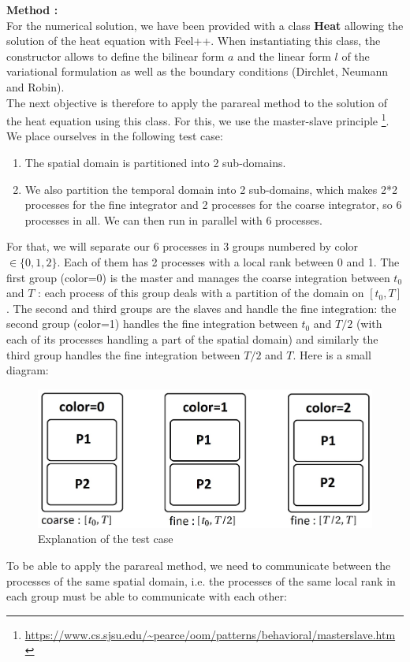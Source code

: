 \noindent \textbf{Method :} \\
For the numerical solution, we have been provided with a class \textbf{Heat} allowing the solution of the heat equation with Feel++. When instantiating this class, the constructor allows to define the bilinear form $a$ and the linear form $l$ of the variational formulation as well as the boundary conditions (Dirchlet, Neumann and Robin). \\
The next objective is therefore to apply the parareal method to the solution of the heat equation using this class. For this, we use the master-slave principle \footnote[1]{\url{https://www.cs.sjsu.edu/~pearce/oom/patterns/behavioral/masterslave.htm}}. 
\newpage
\noindent We place ourselves in the following test case:
\begin{enumerate}[label=\ding{213}]
	\item The spatial domain is partitioned into 2 sub-domains.
	\item We also partition the temporal domain into 2 sub-domains, which makes 2*2 processes for the fine integrator and 2 processes for the coarse integrator, so 6 processes in all. We can then run in parallel with 6 processes.
\end{enumerate}
For that, we will separate our 6 processes in 3 groups numbered by color $\in\{0,1,2\}$. Each of them has 2 processes with a local rank between 0 and 1. The first group (color=0) is the master and manages the coarse integration between $t_0$ and $T$ : each process of this group deals with a partition of the domain on $[t_0,T]$. The second and third groups are the slaves and handle the fine integration: the second group (color=1) handles the fine integration between $t_0$ and $T/2$ (with each of its processes handling a part of the spatial domain) and similarly the third group handles the fine integration between $T/2$ and $T$. Here is a small diagram:
\begin{figure}[H]
	\centering
	\includegraphics[width=0.7\linewidth]{"images/parareal/feelpp/master_slave.jpg"}
	\caption{Explanation of the test case}
\end{figure}
\noindent To be able to apply the parareal method, we need to communicate between the processes of the same spatial domain, i.e. the processes of the same local rank in each group must be able to communicate with each other:
